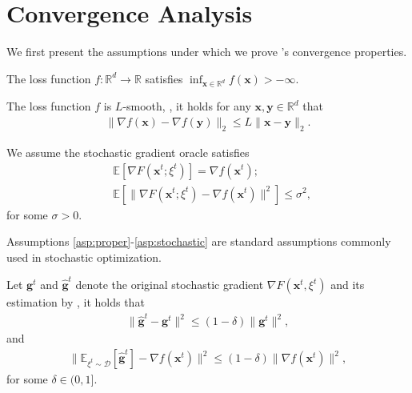 \section{Convergence Analysis}

We first present the assumptions under which we prove \celora's convergence properties. 

\begin{assumption}\label{asp:proper}
    The loss function $f:\mathbb{R}^{d}\rightarrow\mathbb{R}$ satisfies $\inf_{\mathbf{x}\in\mathbb{R}^d}f(\mathbf{x})>-\infty$.
\end{assumption}
\begin{assumption}[$L$-Smoothness]\label{asp:smoothness}
    The loss function $f$ is $L$-smooth, \ie, it holds for any $\mathbf{x},\mathbf{y}\in\mathbb{R}^{d}$ that
    \begin{align*}
        \|\nabla f(\mathbf{x})-\nabla f(\mathbf{y})\|_2\le L\|\mathbf{x}-\mathbf{y}\|_2.
    \end{align*}
\end{assumption}
\begin{assumption}\label{asp:stochastic}
    We assume the stochastic gradient oracle satisfies
    \begin{align}
        &\mathbb{E}[\nabla F(\mathbf{x}^t;\xi^t)]=\nabla f(\mathbf{x}^t);\\
        &\mathbb{E}[\|\nabla F(\mathbf{x}^t;\xi^t)-\nabla f(\mathbf{x}^t)\|^2]\le\sigma^2,
    \end{align}
    for some $\sigma>0$.
\end{assumption}

Assumptions \ref{asp:proper}-\ref{asp:stochastic} are standard assumptions commonly used in stochastic optimization. 

\begin{assumption}\label{asp:contractive}
    Let $\mathbf{g}^t$ and $\hat{\mathbf{g}}^t$ denote the original stochastic gradient $\nabla F(\mathbf{x}^t,\xi^t)$ and its estimation by \celora, it holds that
    \begin{align}
        \|\hat{\mathbf{g}}^t-\mathbf{g}^t\|^2\le(1-\delta)\|\mathbf{g}^t\|^2,\label{eq:asp-cgk}
    \end{align}
    and 
    \begin{align}
        \|\mathbb{E}_{\xi^t\sim\mathcal{D}}[\hat{\mathbf{g}}^t]-\nabla f(\mathbf{x}^t)\|^2\le(1-\delta)\|\nabla f(\mathbf{x}^t)\|^2,\label{eq:asp-ecgk}
    \end{align}
    for some $\delta\in(0,1].$
\end{assumption}

